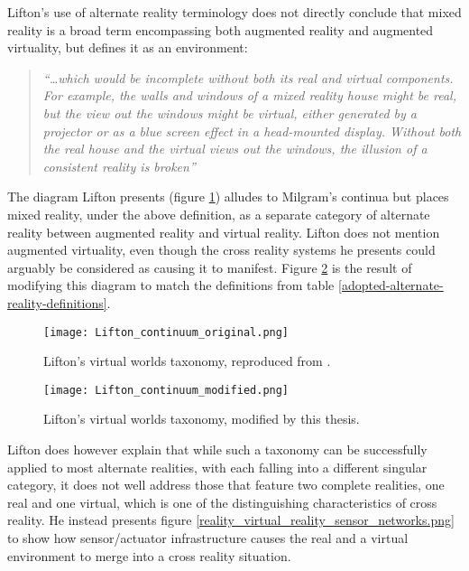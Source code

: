 Lifton's use of alternate reality terminology does not directly conclude that mixed reality is a broad term encompassing both augmented reality and augmented virtuality, but defines it as an environment:

\begin{quote}
	\textit{``\ldots which would be incomplete without both its real and virtual components. For example, the walls and windows of a mixed reality house might be real, but the view out the windows might be virtual, either generated by a projector or as a blue screen effect in a head-mounted display. Without both the real house and the virtual views out the windows, the illusion of a consistent reality is broken''}~\cite{Lifton2007a}
\end{quote}

The diagram Lifton presents (figure \ref{original_lifton_axis.png}) alludes to Milgram's continua but places mixed reality, under the above definition, as a separate category of alternate reality between augmented reality and virtual reality. Lifton does not mention augmented virtuality, even though the cross reality systems he presents could arguably be considered as causing it to manifest. Figure \ref{modified_lifton_axis.png} is the result of modifying this diagram to match the definitions from table \ref{adopted-alternate-reality-definitions}.

\begin{figure}[h]
	\centering
	\texttt{[image: Lifton\_continuum\_original.png]}
	\caption{Lifton's virtual worlds taxonomy, reproduced from \cite{Lifton2007a}.}
	\label{original_lifton_axis.png}
\end{figure}

\begin{figure}[h]
	\centering
	\texttt{[image: Lifton\_continuum\_modified.png]}
	\caption{Lifton's virtual worlds taxonomy, modified by this thesis.}
	\label{modified_lifton_axis.png}
\end{figure}

Lifton does however explain that while such a taxonomy can be successfully applied to most alternate realities, with each falling into a different singular category, it does not well address those that feature two complete realities, one real and one virtual, which is one of the distinguishing characteristics of cross reality. He instead presents figure \ref{reality_virtual_reality_sensor_networks.png} to show how sensor/actuator infrastructure causes the real and a virtual environment to merge into a cross reality situation.

